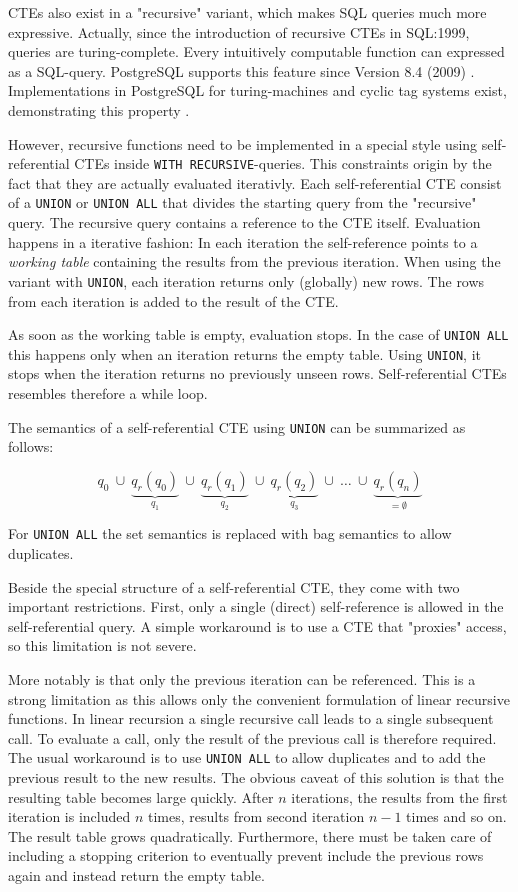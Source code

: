 CTEs also exist in a "recursive" variant, which makes SQL queries much more expressive. Actually, since the introduction of recursive CTEs in SQL:1999, queries are turing-complete. Every intuitively computable function can expressed as a SQL-query. PostgreSQL supports this feature since Version 8.4 (2009) \cite[p. 2811]{psql}. Implementations in PostgreSQL for turing-machines and cyclic tag systems exist, demonstrating this property \cite{psqlWikiCTS, psqlWikiTM}.

However, recursive functions need to be implemented in a special style using self-referential CTEs inside \texttt{WITH RECURSIVE}-queries. This constraints origin by the fact that they are actually evaluated iterativly. Each self-referential CTE consist of a \texttt{UNION} or \texttt{UNION ALL} that divides the starting query from the "recursive" query. The recursive query contains a reference to the CTE itself. Evaluation happens in a iterative fashion: In each iteration the self-reference points to a \textit{working table} containing the results from the previous iteration. When using the variant with \texttt{UNION}, each iteration returns only (globally) new rows. The rows from each iteration is added to the result of the CTE.

As soon as the working table is empty, evaluation stops. In the case of \texttt{UNION ALL} this happens only when an iteration returns the empty table. Using \texttt{UNION}, it stops when the iteration returns no previously unseen rows. Self-referential CTEs resembles therefore a while loop.

The semantics of a self-referential CTE using \texttt{UNION} can be summarized as follows:

$$
q_0 ~\cup ~\underbrace{q_r(q_0)}_{q_1} ~\cup~ \underbrace{q_r(q_1)}_{q_2}~ \cup~\underbrace{q_r(q_2)}_{q_3}~ \cup ~\hdots ~ \cup ~ \underbrace{q_r(q_n)}_{= \emptyset}
$$

For \texttt{UNION ALL} the set semantics is replaced with bag semantics to allow duplicates.

Beside the special structure of a self-referential CTE, they come with two important restrictions. First, only a single (direct) self-reference is allowed in the self-referential query. A simple workaround is to use a CTE that "proxies" access, so this limitation is not severe.

More notably is that only the previous iteration can be referenced. This is a strong limitation as this allows only the convenient formulation of linear recursive functions. In linear recursion a single recursive call leads to a single subsequent call. To evaluate a call, only the result of the previous call is therefore required. The usual workaround is to use \texttt{UNION ALL} to allow duplicates and to add the previous result to the new results. The obvious caveat of this solution is that the resulting table becomes large quickly. After $n$ iterations, the results from the first iteration is included $n$ times, results from second iteration $n-1$ times and so on. The result table grows quadratically. Furthermore, there must be taken care of including a stopping criterion to eventually prevent include the previous rows again and instead return the empty table.



